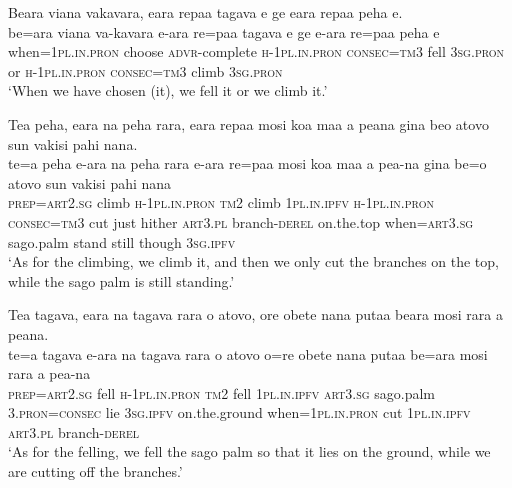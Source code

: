 \ea\label{ex:text12-4}
Beara viana vakavara, eara repaa tagava e ge eara repaa peha e.\\
\gll be=ara	viana	va-kavara	e-ara	re=paa	tagava	e	ge	e-ara	re=paa	peha	e\\
     when=1\textsc{pl}.\textsc{in}.\textsc{pron}	choose	\textsc{advr}-complete	\textsc{h}-1\textsc{pl}.\textsc{in}.\textsc{pron}	\textsc{consec}=\textsc{tm}3	fell	3\textsc{sg}.\textsc{pron}	or	\textsc{h}-1\textsc{pl}.\textsc{in}.\textsc{pron}	\textsc{consec}=\textsc{tm}3	climb	3\textsc{sg}.\textsc{pron}\\
\glt `When we have chosen (it), we fell it or we climb it.'
\z

\ea\label{ex:text12-5}
Tea peha, eara na peha rara, eara repaa mosi koa maa a peana gina beo atovo sun vakisi pahi nana.\\
\gll te=a	peha	e-ara	na	peha	rara	e-ara	re=paa	mosi	koa	maa	a	pea-na	gina	be=o	atovo	sun	vakisi	pahi	nana\\
     \textsc{prep}=\textsc{art}2.\textsc{sg}	climb	\textsc{h}-1\textsc{pl}.\textsc{in}.\textsc{pron}	\textsc{tm}2	climb	1\textsc{pl}.\textsc{in}.\textsc{ipfv}	\textsc{h}-1\textsc{pl}.\textsc{in}.\textsc{pron}	\textsc{consec}=\textsc{tm}3	cut	just	hither	\textsc{art}3.\textsc{pl}	branch-\textsc{derel}	on.the.top	when=\textsc{art}3.\textsc{sg}	sago.palm	stand	still	though	3\textsc{sg}.\textsc{ipfv}\\
\glt `As for the climbing, we climb it, and then we only cut the branches on the top, while the sago palm is still standing.'
\z

\ea\label{ex:text12-6}
Tea tagava, eara na tagava rara o atovo, ore obete nana putaa beara mosi rara a peana.\\
\gll te=a	tagava	e-ara	na	tagava	rara	o	atovo	o=re	obete	nana	putaa	be=ara	mosi	rara	a	pea-na\\
     \textsc{prep}=\textsc{art}2.\textsc{sg}	fell	\textsc{h}-1\textsc{pl}.\textsc{in}.\textsc{pron}	\textsc{tm}2	fell	1\textsc{pl}.\textsc{in}.\textsc{ipfv}	\textsc{art}3.\textsc{sg}	sago.palm	3.\textsc{pron}=\textsc{consec}	lie	3\textsc{sg}.\textsc{ipfv}	on.the.ground	when=1\textsc{pl}.\textsc{in}.\textsc{pron}	cut	1\textsc{pl}.\textsc{in}.\textsc{ipfv}	\textsc{art}3.\textsc{pl}	branch-\textsc{derel}\\
\glt `As for the felling, we fell the sago palm so that it lies on the ground, while we are cutting off the branches.'
\z

